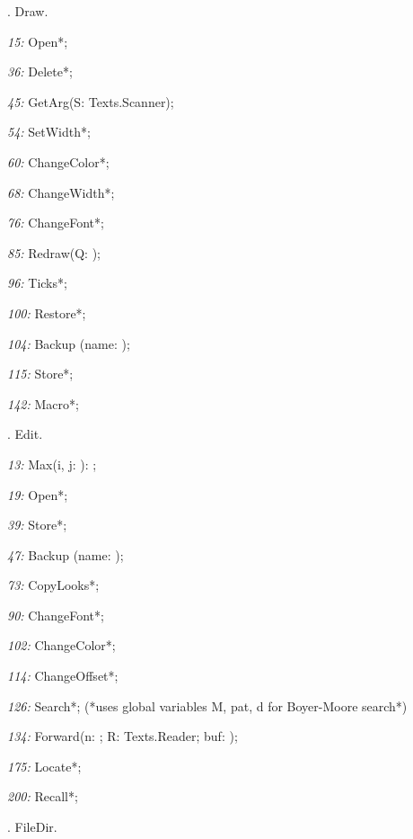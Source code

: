 . Draw.

\item{\it 15:} Open*;
\item{\it 36:} Delete*;
\item{\it 45:} GetArg(\VAR S: Texts.Scanner);
\item{\it 54:} SetWidth*;
\item{\it 60:} ChangeColor*;
\item{\it 68:} ChangeWidth*;
\item{\it 76:} ChangeFont*;
\item{\it 85:} Redraw(Q: \BOOLEAN);
\item{\it 96:} Ticks*;
\item{\it 100:} Restore*;
\item{\it 104:} Backup (\VAR name: \ARRAYOF\CHAR);
\item{\it 115:} Store*;
\item{\it 142:} Macro*;

. Edit.

\item{\it 13:} Max(i, j: \LONGINT): \LONGINT;
\item{\it 19:} Open*;
\item{\it 39:} Store*;
\item{\it 47:} Backup (\VAR name: \ARRAYOF\CHAR);
\item{\it 73:} CopyLooks*;
\item{\it 90:} ChangeFont*;
\item{\it 102:} ChangeColor*;
\item{\it 114:} ChangeOffset*;
\item{\it 126:} Search*;  (*uses global variables M, pat, d for Boyer-Moore search*)
\item{\it 134:} Forward(n: \INTEGER; \VAR R: Texts.Reader; \VAR buf: \ARRAYOF\CHAR);
\item{\it 175:} Locate*;
\item{\it 200:} Recall*;

. FileDir.

